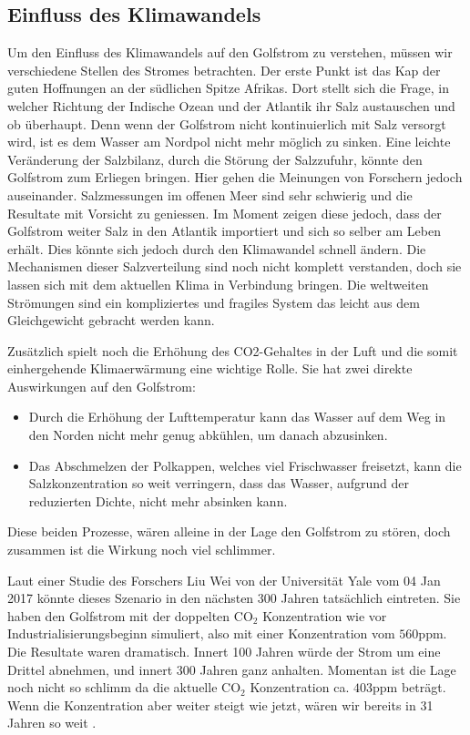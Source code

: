\subsection{Einfluss des Klimawandels}\label{thermohalin:EinflussKlimawandel}
Um den Einfluss des Klimawandels auf den Golfstrom zu verstehen, müssen wir verschiedene Stellen des Stromes betrachten.
Der erste Punkt ist das Kap der guten Hoffnungen an der südlichen Spitze Afrikas.
Dort stellt sich die Frage, in welcher Richtung der Indische Ozean und der Atlantik ihr Salz austauschen und ob überhaupt. Denn wenn der Golfstrom nicht kontinuierlich mit Salz versorgt wird, ist es dem Wasser am Nordpol nicht mehr möglich zu sinken. Eine leichte Veränderung der Salzbilanz, durch die Störung der Salzzufuhr,  könnte den Golfstrom zum Erliegen bringen. Hier gehen die Meinungen von Forschern jedoch auseinander. Salzmessungen im offenen Meer sind sehr schwierig und die Resultate mit Vorsicht zu geniessen.
Im Moment zeigen diese jedoch, dass der Golfstrom weiter Salz in den Atlantik importiert und sich so selber am Leben erhält. Dies könnte sich jedoch durch den Klimawandel schnell ändern. Die Mechanismen dieser Salzverteilung sind noch nicht komplett verstanden, doch sie lassen sich mit dem aktuellen Klima in Verbindung bringen. Die weltweiten Strömungen sind ein kompliziertes und fragiles System das leicht aus dem Gleichgewicht gebracht werden kann. 

Zusätzlich spielt noch die Erhöhung des CO2-Gehaltes in der Luft und die somit einhergehende Klimaerwärmung eine wichtige Rolle. Sie hat zwei direkte Auswirkungen auf den Golfstrom:

\begin{itemize}
	\item Durch die Erhöhung der Lufttemperatur kann das Wasser auf dem Weg in den Norden nicht mehr genug abkühlen, um danach abzusinken.
	\item Das Abschmelzen der Polkappen, welches viel Frischwasser freisetzt, kann die Salzkonzentration so weit verringern, dass das Wasser, aufgrund der reduzierten Dichte, nicht mehr absinken kann.
\end{itemize}

Diese beiden Prozesse, wären alleine in der Lage den Golfstrom zu stören, doch zusammen ist die Wirkung noch viel schlimmer.

Laut einer Studie des Forschers Liu Wei von der Universität Yale vom 04 Jan 2017 \cite{thermohalin:liuwei} könnte dieses Szenario in den nächsten 300 Jahren tatsächlich eintreten. Sie haben den Golfstrom mit der doppelten $\text{CO}_2$ Konzentration wie vor Industrialisierungsbeginn simuliert, also mit einer Konzentration vom $560\text{ppm}$. Die Resultate waren dramatisch. Innert 100 Jahren würde der Strom um eine Drittel abnehmen, und innert 300 Jahren ganz anhalten. Momentan ist die Lage noch nicht so schlimm da die aktuelle $\text{CO}_2$ Konzentration ca. $403\text{ppm}$ beträgt. Wenn die Konzentration aber weiter steigt wie jetzt, wären wir bereits in 31 Jahren so weit \cite{thermohalin:c02}.

